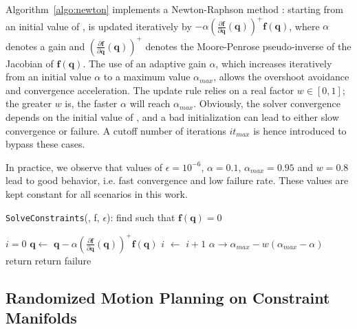 Algorithm~\ref{algo:newton} implements a Newton-Raphson method
\cite{bonnans2006numerical}: starting from an initial value of
\config{}, \config{} is updated iteratively by $- \alpha
\left(\frac{\partial \mathbf{f}}{\partial
  \mathbf{q}}(\mathbf{q})\right)^{+} \mathbf{f}(\mathbf{q})$, where
$\alpha$ denotes a gain and $\left(\frac{\partial \mathbf{f}}{\partial
  \mathbf{q}}(\mathbf{q})\right)^{+}$ denotes the Moore-Penrose
pseudo-inverse of the Jacobian of $\mathbf{f}(\mathbf{q})$. The use of
an adaptive gain $\alpha$, which increases iteratively from an initial
value $\alpha$ to a maximum value $\alpha_{max}$, allows the overshoot
avoidance and convergence acceleration. The update rule relies on a
real factor $w \in [0,1]$; the greater $w$ is, the faster $\alpha$
will reach $\alpha_{max}$. Obviously, the solver convergence depends
on the initial value of \config{}, and a bad initialization can lead
to either slow convergence or failure. A cutoff number of iterations
$it_{max}$ is hence introduced to bypass these cases.

In practice, we observe that values of $\epsilon=10^{-6}$,
$\alpha=0.1$, $\alpha_{max}=0.95$ and $w=0.8$ lead to good behavior,
i.e. fast convergence and low failure rate. These values are kept
constant for all scenarios in this work.

\begin{algorithm}
\caption{\texttt{SolveConstraints}(\config{}, f, $\epsilon$): find
  \config{} such that $\mathbf{f}(\mathbf{q}) = 0$}
\label{algo:newton}
\begin{algorithmic}
\STATE $i=0$
\STATE $\mathbf{q} \leftarrow$ $\mathbf{q} - \alpha \left(\frac{\partial \mathbf{f}}{\partial \mathbf{q}}(\mathbf{q})\right)^{+} \mathbf{f}(\mathbf{q})$
\STATE $i$ $\leftarrow$ $i+1$
\STATE $\alpha \rightarrow \alpha_{max} - w(\alpha_{max} - \alpha)$
\ENDWHILE
{}
\STATE return \config{}
\ELSE
\STATE return failure
\ENDIF
\end{algorithmic}
\end{algorithm}

\subsection{Randomized Motion Planning on Constraint Manifolds}
\label{subsec:chap2-constraint-motion-planning}

